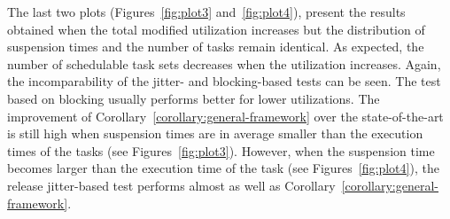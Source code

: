 The last two plots (Figures~\ref{fig:plot3} and~\ref{fig:plot4}), present the results obtained when the total modified utilization increases but the distribution of suspension times and the number of tasks remain identical. As expected, the number of schedulable task sets decreases when the utilization increases. Again, the incomparability of the jitter- and blocking-based tests can be seen. The test based on blocking usually performs better for lower utilizations. The improvement of Corollary~\ref{corollary:general-framework} over the state-of-the-art is still high when suspension times are in average smaller than the execution times of the tasks (see Figures~\ref{fig:plot3}). However, when the suspension time becomes larger than the execution time of the task (see Figures~\ref{fig:plot4}), the release jitter-based test performs almost as well as Corollary~\ref{corollary:general-framework}.
